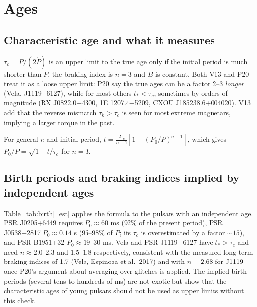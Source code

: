\documentclass[11pt,a4paper]{article}
\newcommand{\src}[1]{\textsf{[#1]}}
\begin{document}
\section{Ages}\label{sec:ages}
\subsection{Characteristic age and what it measures}
$\tau_c=P/(2\dot P)$ is an upper limit to the true age only if the initial period is much shorter than $P$, the braking index is $n=3$ and $B$ is constant. Both V13 and P20 treat it as a loose upper limit: P20 say the true ages can be a factor 2--3 \emph{longer} (Vela, J1119$-$6127), while for most others $t_*<\tau_c$, sometimes by orders of magnitude (RX J0822.0$-$4300, 1E 1207.4$-$5209, CXOU J185238.6+004020). V13 add that the reverse mismatch $\tau_k>\tau_c$ is seen for most extreme magnetars, implying a larger torque in the past.

For general $n$ and initial period, $t=\frac{2\tau_c}{n-1}\left[1-(P_0/P)^{n-1}\right]$, which gives $P_0/P=\sqrt{1-t/\tau_c}$ for $n=3$.

\subsection{Birth periods and braking indices implied by independent ages}
Table~\ref{tab:birth} \src{est} applies the formula to the pulsars with an independent age. PSR J0205+6449 requires $P_0\approx60$ ms (92\% of the present period), PSR J0538+2817 $P_0\approx0.14$ s (95--98\% of $P$; its $\tau_c$ is overestimated by a factor $\sim15$), and PSR B1951+32 $P_0\approx19$--$30$ ms. Vela and PSR J1119$-$6127 have $t_*>\tau_c$ and need $n\approx2.0$--$2.3$ and $1.5$--$1.8$ respectively, consistent with the measured long-term braking indices of 1.7 (Vela, Espinoza et al.\ 2017) and with $n=2.68$ for J1119 once P20's argument about averaging over glitches is applied. The implied birth periods (several tens to hundreds of ms) are not exotic but show that the characteristic ages of young pulsars should not be used as upper limits without this check.
\end{document}
